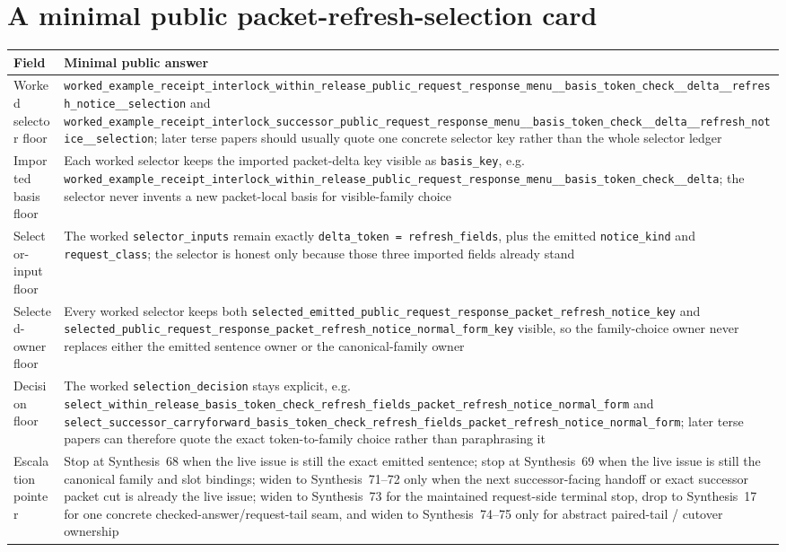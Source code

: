 \documentclass[11pt]{article}
\begin{document}
\section{A minimal public packet-refresh-selection card}
\begin{table}[t]
\centering
\small
\begin{tabularx}{\linewidth}{@{}lX@{}}
\toprule
Field & Minimal public answer \\
\midrule
Worked selector floor & \nolinkurl{worked_example_receipt_interlock_within_release_public_request_response_menu__basis_token_check__delta__refresh_notice__selection} and \nolinkurl{worked_example_receipt_interlock_successor_public_request_response_menu__basis_token_check__delta__refresh_notice__selection}; later terse papers should usually quote one concrete selector key rather than the whole selector ledger \\
Imported basis floor & Each worked selector keeps the imported packet-delta key visible as \nolinkurl{basis_key}, e.g. \nolinkurl{worked_example_receipt_interlock_within_release_public_request_response_menu__basis_token_check__delta}; the selector never invents a new packet-local basis for visible-family choice \\
Selector-input floor & The worked \nolinkurl{selector_inputs} remain exactly \nolinkurl{delta_token = refresh_fields}, plus the emitted \nolinkurl{notice_kind} and \nolinkurl{request_class}; the selector is honest only because those three imported fields already stand \\
Selected-owner floor & Every worked selector keeps both \nolinkurl{selected_emitted_public_request_response_packet_refresh_notice_key} and \nolinkurl{selected_public_request_response_packet_refresh_notice_normal_form_key} visible, so the family-choice owner never replaces either the emitted sentence owner or the canonical-family owner \\
Decision floor & The worked \nolinkurl{selection_decision} stays explicit, e.g. \nolinkurl{select_within_release_basis_token_check_refresh_fields_packet_refresh_notice_normal_form} and \nolinkurl{select_successor_carryforward_basis_token_check_refresh_fields_packet_refresh_notice_normal_form}; later terse papers can therefore quote the exact token-to-family choice rather than paraphrasing it \\
Escalation pointer & Stop at Synthesis~68 when the live issue is still the exact emitted sentence; stop at Synthesis~69 when the live issue is still the canonical family and slot bindings; widen to Synthesis~71--72 only when the next successor-facing handoff or exact successor packet cut is already the live issue; widen to Synthesis~73 for the maintained request-side terminal stop, drop to Synthesis~17 for one concrete checked-answer/request-tail seam, and widen to Synthesis~74--75 only for abstract paired-tail / cutover ownership \\

\end{tabularx}
\end{table}
\end{document}
